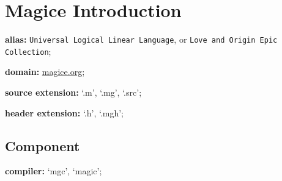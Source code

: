 \documentclass[UTF8]{book}
\begin{document}
	\author{dosconio}
	\section{Magice Introduction}
	
	\textbf{alias:} \texttt{Universal Logical Linear Language}, or
		\texttt{Love and Origin Epic Collection};
	
	\textbf{domain:} \href{http://magice.org}{magice.org};
	
	\textbf{source extension:} `.m', `.mg', `.src';
	
	\textbf{header extension:} `.h', `.mgh';
	
		\subsection{Component}
		
		\textbf{compiler:} `mgc', `magic';
	
\end{document}
